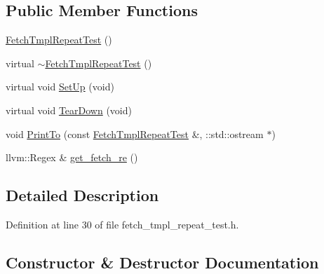 \subsection*{Public Member Functions}
\begin{DoxyCompactItemize}
\item 
\hyperlink{classclang_1_1tidy_1_1pagesjaunes_1_1test_1_1_fetch_tmpl_repeat_test_a53ae10e978ecb391634a66694ff228ec}{Fetch\+Tmpl\+Repeat\+Test} ()
\item 
virtual \hyperlink{classclang_1_1tidy_1_1pagesjaunes_1_1test_1_1_fetch_tmpl_repeat_test_abc73368f428efceaea6d86ece8a84067}{$\sim$\+Fetch\+Tmpl\+Repeat\+Test} ()
\item 
virtual void \hyperlink{classclang_1_1tidy_1_1pagesjaunes_1_1test_1_1_fetch_tmpl_repeat_test_a3871f1883bcc4420f42f4bfb0043add8}{Set\+Up} (void)
\item 
virtual void \hyperlink{classclang_1_1tidy_1_1pagesjaunes_1_1test_1_1_fetch_tmpl_repeat_test_a2df8e1e13d43d0bad1347f1da7dc53d4}{Tear\+Down} (void)
\item 
void \hyperlink{classclang_1_1tidy_1_1pagesjaunes_1_1test_1_1_fetch_tmpl_repeat_test_a68c8f2164da8d6e48f1138ce9f9a18ec}{Print\+To} (const \hyperlink{classclang_1_1tidy_1_1pagesjaunes_1_1test_1_1_fetch_tmpl_repeat_test}{Fetch\+Tmpl\+Repeat\+Test} \&, \+::std\+::ostream $\ast$)
\item 
llvm\+::\+Regex \& \hyperlink{classclang_1_1tidy_1_1pagesjaunes_1_1test_1_1_fetch_tmpl_repeat_test_a7e71f48020a2dfe5179f289ade5ce00b}{get\+\_\+fetch\+\_\+re} ()
\end{DoxyCompactItemize}


\subsection{Detailed Description}


Definition at line 30 of file fetch\+\_\+tmpl\+\_\+repeat\+\_\+test.\+h.



\subsection{Constructor \& Destructor Documentation}
\mbox{\label{classclang_1_1tidy_1_1pagesjaunes_1_1test_1_1_fetch_tmpl_repeat_test_a53ae10e978ecb391634a66694ff228ec}} 
